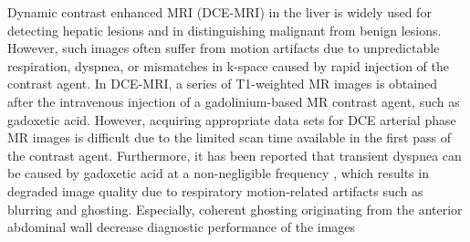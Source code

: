 \documentclass[num-refs]{wiley-article}
\begin{document}
Dynamic contrast enhanced MRI (DCE-MRI) in the liver is widely used for detecting hepatic lesions and in distinguishing malignant from benign lesions. However, such images often suffer from motion artifacts due to unpredictable respiration, dyspnea, or mismatches in k-space caused by rapid injection of the contrast agent\cite{motosugi2015investigation}\cite{davenport2013comparison}. In DCE-MRI, a series of T1-weighted MR images is obtained after the intravenous injection of a gadolinium-based MR contrast agent, such as gadoxetic acid. However, acquiring appropriate data sets for DCE arterial phase MR images is difficult due to the limited scan time available in the first pass of the contrast agent. Furthermore, it has been reported that transient dyspnea can be caused by gadoxetic acid at a non-negligible frequency \cite{motosugi2015investigation}\cite{davenport2013comparison}, which results in degraded image quality due to respiratory motion-related artifacts such as blurring and ghosting\cite{stadler2007artifacts}. Especially, coherent ghosting originating from the anterior abdominal wall decrease diagnostic performance of the images\cite{chavhan2013abdominal}
\end{document}
